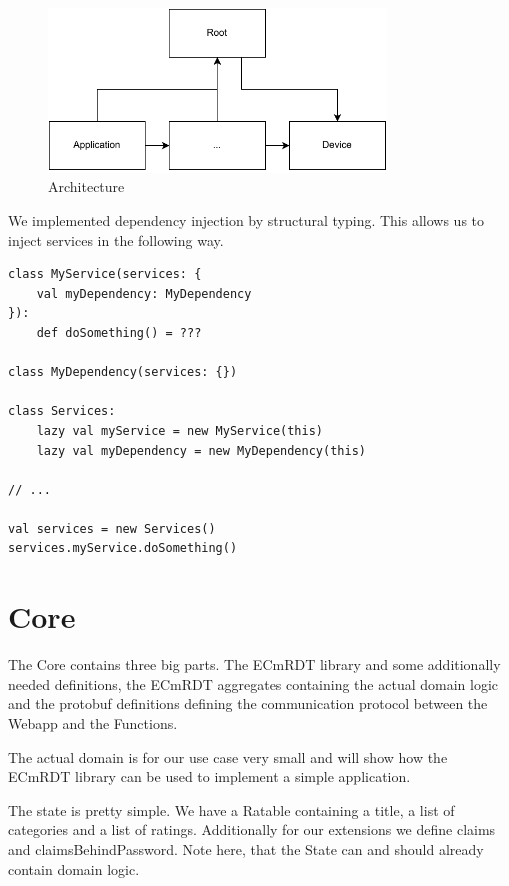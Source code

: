 \documentclass[
	ngerman,
	ruledheaders=section,   %
	class=report,		    %
	thesis={type=bachelor}, %
	accentcolor=9c,			%
	custommargins=false,    %
	marginpar=false,        %
	parskip=half-,          %
	fontsize=11pt,          %
]{tudapub}
\begin{document}
\begin{figure}[htbp]
\centering
\includegraphics[width=0.8\textwidth]{architecture_1.pdf}
\caption{Architecture}
\label{fig:architecture}
\end{figure}


We implemented dependency injection by structural typing. This allows us to inject services in the following way.

\begin{lstlisting}
class MyService(services: {
	val myDependency: MyDependency
}):
	def doSomething() = ???

class MyDependency(services: {})

class Services:
	lazy val myService = new MyService(this)
	lazy val myDependency = new MyDependency(this)

// ...

val services = new Services()
services.myService.doSomething()

\end{lstlisting}

\section{Core}
The Core contains three big parts. The ECmRDT library and some additionally needed definitions, the ECmRDT aggregates containing the actual domain logic and the protobuf definitions defining the communication protocol between the Webapp and the Functions.

The actual domain is for our use case very small and will show how the ECmRDT library can be used to implement a simple application.


The state is pretty simple. We have a Ratable containing a title, a list of categories and a list of ratings. Additionally for our extensions we define claims and claimsBehindPassword. Note here, that the State can and should already contain domain logic. 
\end{document}
